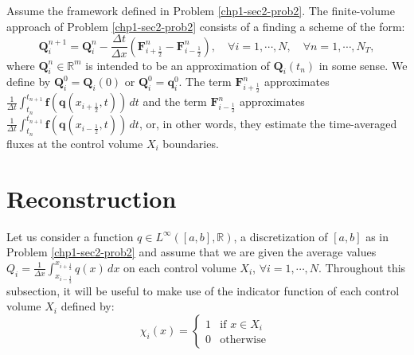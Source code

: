 \begin{prob}[1D-FV scheme]
	\label{chp1-sec2-prob3}
	Assume the framework defined in Problem \ref{chp1-sec2-prob2}.
	The finite-volume approach of Problem \ref{chp1-sec2-prob2}
	consists of a finding a scheme of the form:
        \begin{equation*}
		\mathbf{Q}_{i}^{n+1} =  \mathbf{Q}_{i}^{n} -
		\frac{\Delta t}{\Delta x} (\mathbf{F}_{i+\frac{1}{2}}^{n} - \mathbf{F}_{i-\frac{1}{2}}^{n}),
                \quad \forall i = 1, \cdots, N,
                \quad \forall n = 1, \cdots, N_T,
        \end{equation*}
	where $\mathbf{Q}_{i}^{n} \in \mathbb{R}^m$ is intended to be an approximation
	of $\mathbf{Q}_i(t_{n})$ in some sense. We define by $\mathbf{Q}_{i}^{0} = \mathbf{Q}_i(0)$ or
	$\mathbf{Q}_{i}^{0} = \mathbf{q}^{0}_{i}$.
	The term $\mathbf{F}_{i+\frac{1}{2}}^{n}$ approximates
	$\frac{1}{\Delta t}\int_{t_n}^{t_{n+1}} \mathbf{f}(\mathbf{q}(x_{i+\frac{1}{2}}, t)) \,dt $
	and the term
        $\mathbf{F}_{i-\frac{1}{2}}^{n}$ approximates
	$\frac{1}{\Delta t}\int_{t_n}^{t_{n+1}} \mathbf{f}(\mathbf{q}(x_{i-\frac{1}{2}}, t)) \,dt $,
	or, in other words, they estimate the time-averaged fluxes at the control volume $X_i$ boundaries.
\end{prob}

\citep{colella:1984}
\citep{carpenter:1990} 
\citep{vanleer:1977}
\citep{lin:1994}
\citep{lin:1996}

\section{Reconstruction}
\label{chp1-sec-recon}
Let us consider a function ${q} \in L^{\infty}([a, b],\mathbb{R})$, a discretization of
$[a,b]$ as in Problem \ref{chp1-sec2-prob2}
and assume that we are given the average values ${Q}_i = \frac{1}{\Delta x} 
\int_{x_{i-\frac{1}{2}}}^{x_{i+\frac{1}{2}}} {q}(x) \,dx$
on each control volume $X_i$, $\forall i = 1, \cdots, N $.
Throughout this subsection, it will be useful to make use of the indicator function of
each control volume $X_i$ defined by:
\begin{equation}
	\label{chp1-sec3-1-eq1}
	\chi_{i}(x)=
	\begin{cases}
		1 & \text{if } x \in X_i\\
		0 & \text{otherwise }
	\end{cases}
\end{equation}

